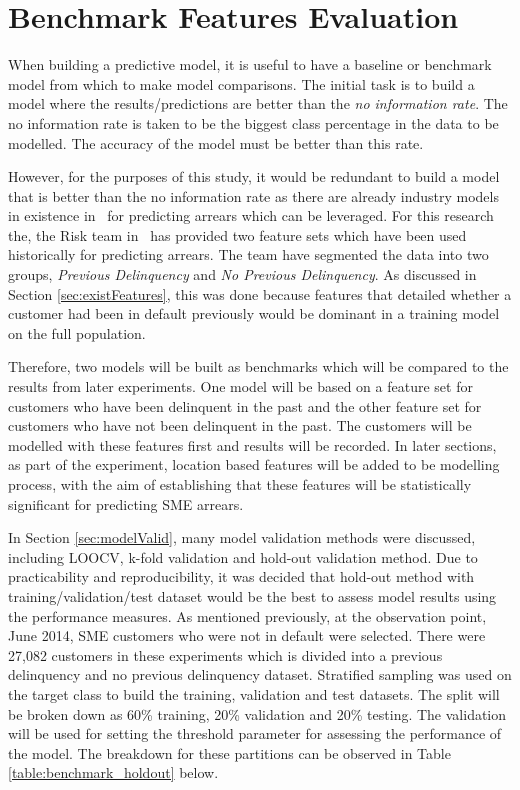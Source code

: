 \section{Benchmark Features Evaluation}\label{sec:benchFeature}
When building a predictive model, it is useful to have a baseline or benchmark model from which to make model comparisons. The initial task is to build a model where the results/predictions are better than the \textit{no information rate}. The no information rate is taken to be the biggest class percentage in the data to be modelled. The
accuracy of the model must be better than this rate. 

However, for the purposes of this study, it would be redundant to build a model that is better than the no information rate as there are already industry models in existence in \subjectname\ for predicting arrears which can be leveraged. For this research the, the Risk team in \subjectname\ has provided two feature sets which have been used historically for predicting arrears. The team have segmented the data into two groups, \textit{Previous Delinquency} and \textit{No Previous Delinquency}. As discussed in Section \ref{sec:existFeatures}, this was done because features that detailed whether a customer had been in default previously would be dominant in a training model on the full population.

Therefore, two models will be built as benchmarks which will be compared to the results from later experiments. One model will be based on a feature set for customers who have been delinquent in the past and the other feature set for customers who have not been delinquent in the past. The customers will be modelled with these features first and results will be recorded. In later sections, as part of the experiment, location based features will be added to be modelling process, with the aim of establishing that these features will be statistically significant for predicting SME arrears. 

In Section \ref{sec:modelValid}, many model validation methods were discussed, including LOOCV, k-fold validation and hold-out validation method. Due to practicability and reproducibility, it was decided that hold-out method with training/validation/test dataset would be the best to assess model results using the performance measures. As mentioned previously, at the observation point, June 2014, SME customers who were not in default were selected. There were 27,082 customers in these experiments which is divided into a previous delinquency and no previous delinquency dataset. Stratified sampling was used on the target class to build the training, validation and test datasets. The split will be broken down as 60\% training, 20\% validation and 20\% testing. The validation will be used for setting the threshold parameter for assessing the performance of the model. The breakdown for these partitions can be observed in Table \ref{table:benchmark_holdout} below. 

